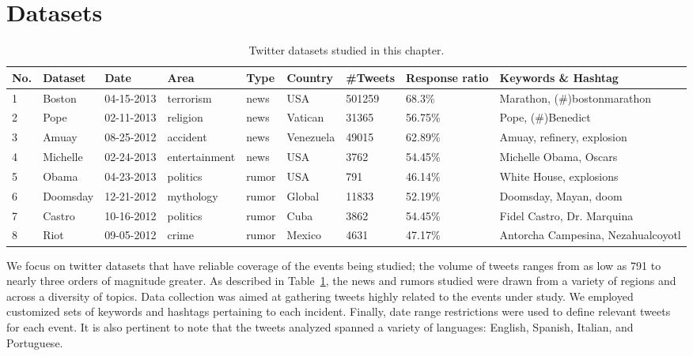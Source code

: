 \section{Datasets}

\begin{table}[!htp]
\tiny
\caption{Twitter datasets studied in this chapter.} %
\vspace{0.5em}
\centering %
\begin{tabular}{| p{0.3cm} | p{1.2cm} | p{1.4cm} | p{1.6cm} | p{0.8cm} | p{1.1cm} | p{0.8cm} | p{1.4cm} | p{4.2cm} | }
\hline %
\textbf{No.}& \textbf{Dataset} & \textbf{Date}  & \textbf{Area} & \textbf{Type} & \textbf{Country} & \textbf{\#Tweets} & \textbf{Response ratio} & \textbf{Keywords \& Hashtag}  \\ [1ex] %
\hline %
1& Boston & 04-15-2013&  terrorism& news & USA &  501259 &68.3\% & Marathon, (\#)bostonmarathon \\[1ex]
\hline
2&  Pope & 02-11-2013 &religion&news & Vatican & 31365 &56.75\% &Pope, (\#)Benedict \\[1ex]
\hline
3& Amuay &08-25-2012&  accident &news & Venezuela&49015 &62.89\% &Amuay, refinery, explosion \\[1ex]
\hline
4& Michelle &02-24-2013&  entertainment & news & USA& 3762& 54.45\% &Michelle Obama, Oscars   \\[1ex]
\hline
5& Obama & 04-23-2013&  politics& rumor & USA & 791&46.14\% &White House, explosions    \\[1ex]
\hline
6& Doomsday & 12-21-2012&  mythology& rumor & Global &11833 &52.19\%& Doomsday, Mayan, doom  \\[1ex]
\hline
7& Castro & 10-16-2012&  politics & rumor & Cuba & 3862& 54.45\% &Fidel Castro, Dr. Marquina \\ [1ex]
\hline
8& Riot & 09-05-2012& crime & rumor & Mexico &4631& 47.17\% & Antorcha Campesina, Nezahualcoyotl\\ [1ex]
\hline
\end{tabular}
\label{table:story-intro} %
\end{table}


We focus on twitter datasets that have reliable coverage of the
events being studied; the volume of tweets ranges from as low as
791 to nearly three orders of magnitude greater.
As described in Table~\ref{table:story-intro},
the news and rumors studied were drawn from a variety of
regions and across a diversity of topics.
Data collection was aimed at gathering tweets highly related to the events
under study. We employed customized sets of keywords and hashtags pertaining
to each incident.
Finally, date range restrictions were used to define relevant tweets for
each event. It is also pertinent to note that the tweets analyzed spanned
a variety of languages: English, Spanish, Italian, and Portuguese.

